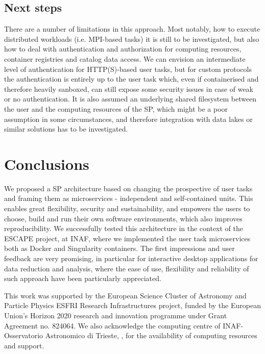 \documentclass[11pt,twoside]{article}
\begin{document}
\subsection{Next steps}
There are a number of limitations in this approach. Most notably, how to execute distributed workloads (i.e. MPI-based tasks) it is still to be investigated, but also how to deal with authentication and authorization for computing resources, container registries and catalog data access. We can envision an intermediate level of authentication for HTTP(S)-based user tasks, but for custom protocols the authentication is entirely up to the user task which, even if containerised and therefore heavily sanboxed, can still expose some security issues in case of weak or no authentication. It is also assumed an underlying shared filesystem between the user and the computing resources of the SP, which might be a poor assumption in some circumstances, and therefore integration with data lakes or similar solutions has to be investigated.




\section{Conclusions}

We proposed a SP architecture based on changing the prospective of user tasks and framing them as microservices - independent and self-contained units. This enables great flexibility, security and sustainability, and empowers the users to choose, build and run their own software environments, which also improves reproducibility. We successfully tested this architecture in the context of the ESCAPE project, at INAF, where we implemented the user task microservices both as Docker and Singularity containers. The first impressions and user feedback are very promising, in particular for interactive desktop applications for data reduction and analysis, where the ease of use, flexibility and reliability of such approach have been particularly appreciated.




\acknowledgements This work was supported by the European Science Cluster of Astronomy and Particle Physics ESFRI Research Infrastructures project, funded by the European Union's Horizon 2020 research and innovation programme under Grant Agreement no. 824064.
We also acknowledge the computing centre of INAF-Osservatorio Astronomico di Trieste, \citep{bertocco,taffoni}, for the availability of computing resources and support.




\end{document}
